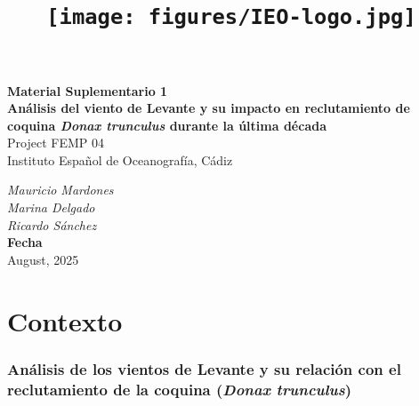 \documentclass[
]{article}
\title{\texttt{[image: figures/IEO-logo.jpg]}}
\author{}
\date{\vspace{-2.5em}}
\begin{document}
\maketitle



\begin{flushleft}
\Large{\textbf{Material Suplementario 1}}\\
\vspace*{2\baselineskip}
\LARGE{\textbf{Análisis del viento de Levante y su impacto en reclutamiento de coquina \textit{Donax trunculus} durante la última década}}\\
\vspace*{5\baselineskip}
\Large{Project FEMP 04}\\
\vspace*{1\baselineskip}
\Large{Instituto Español de Oceanografía, Cádiz }\\
\vspace*{4\baselineskip}
\end{flushleft}
\begin{flushright}
\large{\textit{Mauricio Mardones}}\\
\large{\textit{Marina Delgado}}\\
\large{\textit{Ricardo Sánchez}}\\
\vspace*{1\baselineskip}
\normalsize{\textbf{Fecha}}\\
August, 2025
\end{flushright}



\hypersetup{linkcolor = black}
\newpage
{}

\newpage



\hypersetup{linkcolor = blue}

{
\hypersetup{linkcolor=}
\setcounter{tocdepth}{3}
\tableofcontents
}
\pagebreak

\section{Contexto}\label{contexto}

\subsubsection{\texorpdfstring{Análisis de los vientos de Levante y su relación con el reclutamiento de la coquina (\emph{Donax trunculus})}{Análisis de los vientos de Levante y su relación con el reclutamiento de la coquina (Donax trunculus)}}\label{anuxe1lisis-de-los-vientos-de-levante-y-su-relaciuxf3n-con-el-reclutamiento-de-la-coquina-donax-trunculus}
\end{document}
